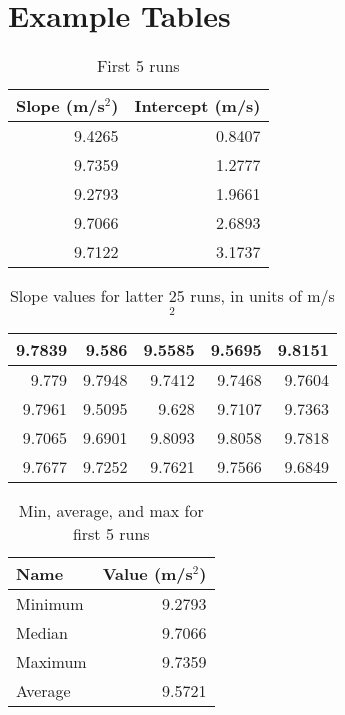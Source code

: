 \section{Example Tables}
%
\begin{table}[ht]
    \centering
    \begin{tabular}{r|r}
        \textbf{Slope} (m/s$^{2}$) & \textbf{Intercept} (m/s) \\
        \hline
        9.4265 & 0.8407 \\
        9.7359 & 1.2777 \\
        9.2793 & 1.9661 \\
        9.7066 & 2.6893 \\
        9.7122 & 3.1737 \\
        \hline
    \end{tabular}
    \caption{First 5 runs}
    \label{table:01.first.5}
\end{table}
%
\begin{table}[ht]
    \centering
    \begin{tabular}{r|r|r|r|r}
        \hline
        9.7839 & 9.586 & 9.5585 & 9.5695 & 9.8151 \\
        \hline
        9.779 & 9.7948 & 9.7412 & 9.7468 & 9.7604 \\
        \hline
        9.7961 & 9.5095 & 9.628 & 9.7107 & 9.7363 \\
        \hline
        9.7065 & 9.6901 & 9.8093 & 9.8058 & 9.7818 \\
        \hline
        9.7677 & 9.7252 & 9.7621 & 9.7566 & 9.6849 \\
        \hline
    \end{tabular}
    \caption{Slope values for latter 25 runs, in units of m/s$^{2}$}
    \label{table:01.latter.25}
\end{table}
%
\begin{table}[ht]
    \centering
    \begin{tabular}{l|r}
        \textbf{Name} & \textbf{Value} (m/s$^{2}$) \\
        \hline
        Minimum & 9.2793 \\
        Median & 9.7066 \\
        Maximum & 9.7359 \\
        Average & 9.5721 \\
        \hline
    \end{tabular}
    \caption{Min, average, and max for first 5 runs}
    \label{table:01.describe.5}
\end{table}
